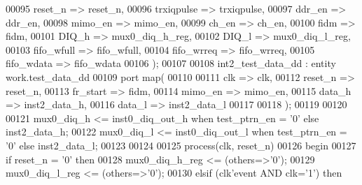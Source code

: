\begin{DoxyCode}
00095       reset_n     => reset_n,
00096       trxiqpulse  => trxiqpulse,
00097       ddr_en      => ddr_en,
00098       mimo_en     => mimo_en,
00099       ch_en       => ch_en, 
00100       fidm        => fidm,
00101       DIQ_h       => mux0_diq_h_reg,
00102       DIQ_l       => mux0_diq_l_reg,
00103       fifo_wfull  => fifo_wfull,
00104       fifo_wrreq  => fifo_wrreq,
00105       fifo_wdata  => fifo_wdata
00106         \textcolor{vhdlchar}{)};
00107   
00108 int2\_test\_data\_dd : \textcolor{keywordflow}{entity} work.test_data_dd
00109 \textcolor{keywordflow}{port} \textcolor{keywordflow}{map}(
00110 
00111    clk            => clk,
00112    reset_n        => reset_n,
00113    fr_start       => fidm,
00114    mimo_en        => mimo_en,  
00115    data_h         => inst2_data_h,
00116    data_l         => inst2_data_l
00117 
00118 \textcolor{vhdlchar}{)};
00119 
00120 
00121 \textcolor{vhdlchar}{mux0_diq_h} \textcolor{vhdlchar}{<=} \textcolor{vhdlchar}{inst0_diq_out_h} \textcolor{keywordflow}{when} \textcolor{vhdlchar}{test_ptrn_en} \textcolor{vhdlchar}{=} \textcolor{vhdlchar}{'}\textcolor{vhdllogic}{}\textcolor{vhdllogic}{0}\textcolor{vhdlchar}{'} \textcolor{keywordflow}{else} \textcolor{vhdlchar}{inst2_data_h};
00122 \textcolor{vhdlchar}{mux0_diq_l} \textcolor{vhdlchar}{<=} \textcolor{vhdlchar}{inst0_diq_out_l} \textcolor{keywordflow}{when} \textcolor{vhdlchar}{test_ptrn_en} \textcolor{vhdlchar}{=} \textcolor{vhdlchar}{'}\textcolor{vhdllogic}{}\textcolor{vhdllogic}{0}\textcolor{vhdlchar}{'} \textcolor{keywordflow}{else} \textcolor{vhdlchar}{inst2_data_l};    
00123 
00124 
00125 \textcolor{keywordflow}{process}(clk, reset_n)
00126 \textcolor{vhdlkeyword}{begin }
00127    \textcolor{keywordflow}{if} \textcolor{vhdlchar}{reset_n} \textcolor{vhdlchar}{=} \textcolor{vhdlchar}{'}\textcolor{vhdllogic}{}\textcolor{vhdllogic}{0}\textcolor{vhdlchar}{'} \textcolor{keywordflow}{then} 
00128       \textcolor{vhdlchar}{mux0_diq_h_reg} \textcolor{vhdlchar}{<=} \textcolor{vhdlchar}{(}\textcolor{keywordflow}{others}\textcolor{vhdlchar}{=}\textcolor{vhdlchar}{>}\textcolor{vhdlchar}{'}\textcolor{vhdllogic}{}\textcolor{vhdllogic}{0}\textcolor{vhdlchar}{'}\textcolor{vhdlchar}{)};
00129       \textcolor{vhdlchar}{mux0_diq_l_reg} \textcolor{vhdlchar}{<=} \textcolor{vhdlchar}{(}\textcolor{keywordflow}{others}\textcolor{vhdlchar}{=}\textcolor{vhdlchar}{>}\textcolor{vhdlchar}{'}\textcolor{vhdllogic}{}\textcolor{vhdllogic}{0}\textcolor{vhdlchar}{'}\textcolor{vhdlchar}{)};
00130    \textcolor{keywordflow}{elsif} \textcolor{vhdlchar}{(}\textcolor{vhdlchar}{clk}\textcolor{vhdlchar}{'}\textcolor{vhdlkeyword}{event} \textcolor{keywordflow}{AND} \textcolor{vhdlchar}{clk}\textcolor{vhdlchar}{=}\textcolor{vhdlchar}{'}\textcolor{vhdllogic}{}\textcolor{vhdllogic}{1}\textcolor{vhdlchar}{'}\textcolor{vhdlchar}{)} \textcolor{keywordflow}{then}

\end{DoxyCode}
